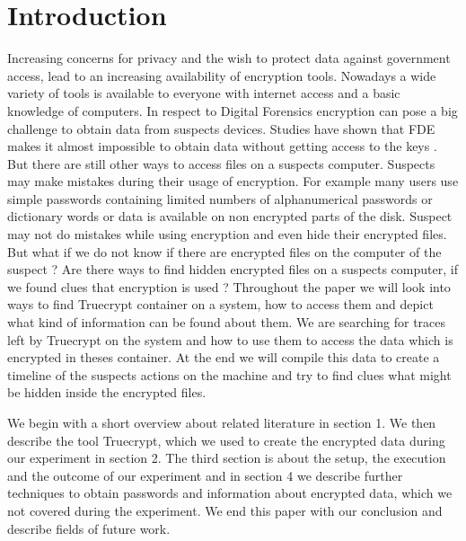\section{Introduction}
Increasing concerns for privacy and the wish to protect data against government access, lead to an increasing availability of encryption tools. Nowadays a wide variety of tools is available to everyone with internet access and a basic knowledge of computers.
In respect to Digital Forensics encryption can pose a big challenge to obtain data from suspects devices. Studies have shown that \gls{FDE} makes it almost impossible to obtain data without getting access to the keys \cite{Casey2011129}. But there are still other ways to access files on a suspects computer. Suspects may make mistakes during their usage of encryption. For example many users use simple passwords containing limited numbers of alphanumerical passwords or dictionary words \cite{worstpractise} or data is available on non encrypted parts of the disk. Suspect may not do mistakes while using encryption and even hide their encrypted files.
But what if we do not know if there are encrypted files on the computer of the suspect ? Are there ways to find hidden encrypted files on a suspects computer, if we found clues that encryption is used ? Throughout the paper we will look into ways to find Truecrypt container on a system, how to access them and depict what kind of information can be found about them. We are searching for traces left by Truecrypt on the system and how to use them to access the data which is encrypted in theses container.
At the end we will compile this data to create a timeline of the suspects actions on the machine and try to find clues what might be hidden inside the encrypted files. 

We begin with a short overview about related literature in section 1. We then describe the tool Truecrypt, which we used to create the encrypted data during our experiment in section 2. The third section is about the setup, the execution and the outcome of our experiment and in section 4 we describe further techniques to obtain passwords and information about encrypted data, which we not covered during the experiment. We end this paper with our conclusion and describe fields of future work.
